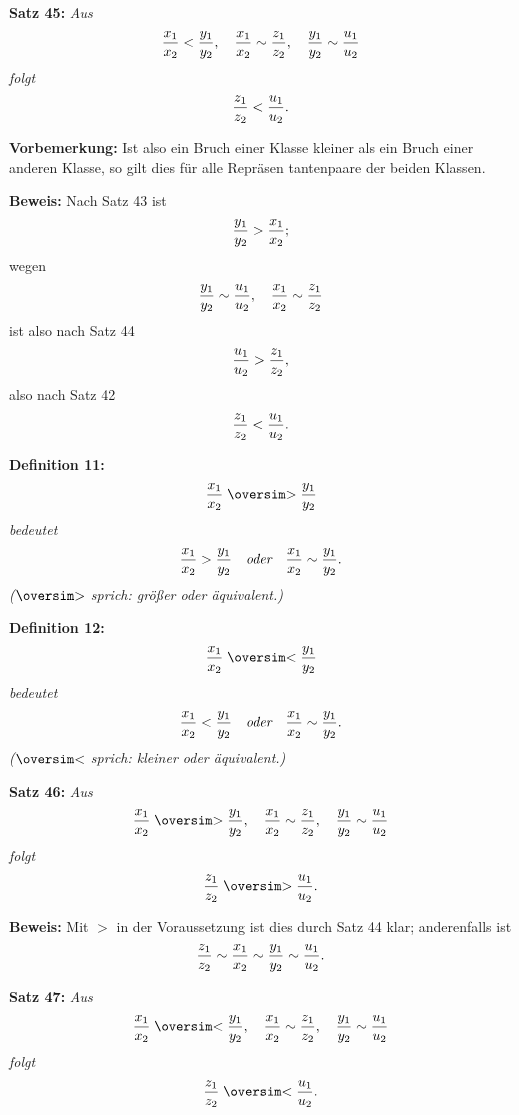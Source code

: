 
{\bf Satz 45:} {\it Aus
$${x_1 \over x_2} < {y_1 \over y_2},\quad {x_1 \over x_2} \sim {z_1 \over z_2},\quad {y_1 \over y_2} \sim {u_1 \over u_2}$$
folgt
$${z_1 \over z_2} < {u_1 \over u_2}.$$}%

{\bf Vorbemerkung:} Ist also ein Bruch einer Klasse kleiner als
ein Bruch einer anderen Klasse, so gilt dies f\"ur alle Repr\"asen%
tantenpaare der beiden Klassen.

{\bf Beweis:} Nach Satz 43 ist
$${y_1 \over y_2} > {x_1 \over x_2};$$
wegen
$${y_1 \over y_2} \sim {u_1 \over u_2},\quad {x_1 \over x_2} \sim {z_1 \over z_2}$$
ist also nach Satz 44
$${u_1 \over u_2} > {z_1 \over z_2},$$
also nach Satz 42
$${z_1 \over z_2} < {u_1 \over u_2}.$$

\ifx\gesim\undefined
  \def\gesim{\mathrel{\mathpalette\oversim >}}
  \def\lesim{\mathrel{\mathpalette\oversim <}}
  \def\oversim#1#2{\lower4pt\vbox{\baselineskip0pt \lineskip.5pt
    \ialign{$\mathsurround=0pt #1\hfil##\hfil$\crcr#2\crcr\sim\crcr}}}
\fi
\medskip


{\bf Definition 11:} {\it $${x_1 \over x_2} \gesim {y_1 \over y_2}$$
bedeutet
$${x_1 \over x_2} > {y_1 \over y_2}\quad\hbox{\it oder}\quad{x_1 \over x_2} \sim {y_1 \over y_2}.$$
{\rm ($\gesim$ sprich: gr\"o{\ss}er oder \"aquivalent.)}}
\medskip


{\bf Definition 12:} {\it $${x_1 \over x_2} \lesim {y_1 \over y_2}$$
bedeutet
$${x_1 \over x_2} < {y_1 \over y_2}\quad\hbox{\it oder}\quad{x_1 \over x_2} \sim {y_1 \over y_2}.$$
{\rm ($\lesim$ sprich: kleiner oder \"aquivalent.)}}
\medskip


{\bf Satz 46:} {\it Aus
$${x_1 \over x_2} \gesim {y_1 \over y_2},\quad {x_1 \over x_2} \sim {z_1 \over z_2},\quad {y_1 \over y_2} \sim {u_1 \over u_2}$$
folgt
$${z_1 \over z_2} \gesim {u_1 \over u_2}.$$}%

{\bf Beweis:} Mit $>$ in der Voraussetzung ist dies durch Satz 44
klar; anderenfalls ist
$${z_1 \over z_2} \sim {x_1 \over x_2} \sim {y_1 \over y_2} \sim {u_1 \over u_2}.$$
\medskip


{\bf Satz 47:} {\it Aus
$${x_1 \over x_2} \lesim {y_1 \over y_2},\quad {x_1 \over x_2} \sim {z_1 \over z_2},\quad {y_1 \over y_2} \sim {u_1 \over u_2}$$
folgt
$${z_1 \over z_2} \lesim {u_1 \over u_2}.$$}%

